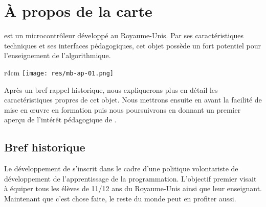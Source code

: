 
\section{À propos de la carte \mb}


\mb est un microcontrôleur développé au Royaume-Unis.
Par ses caractéristiques techniques et ses interfaces
pédagogiques, cet objet possède un fort potentiel pour
l’enseignement de l’algorithmique.



\begin{wrapfigure}{r}{4cm}
	\texttt{[image: res/mb-ap-01.png]}
\end{wrapfigure}

Après un bref rappel historique, nous expliquerons plus en détail les caractéristiques propres de cet objet. Nous mettrons ensuite en avant la facilité de mise en œuvre en formation puis nous poursuivrons en donnant un premier aperçu de l’intérêt pédagogique de \mb.

\subsection{Bref historique}


Le développement de \mb s’inscrit dans le cadre d’une politique volontariste de développement de l’apprentissage de la programmation. L’objectif premier visait à équiper tous les élèves de 11/12 ans du Royaume-Unis ainsi que leur enseignant. Maintenant que c’est chose faite, le reste du monde peut en profiter aussi.



